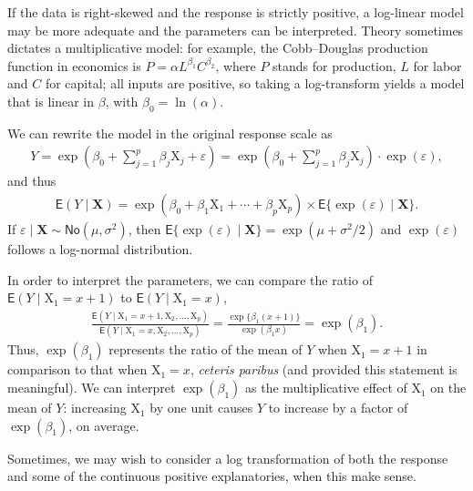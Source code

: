 \documentclass[
  11pt,
  letterpaper,
]{book}
\theoremstyle{definition}
\theoremstyle{definition}
\theoremstyle{definition}
\theoremstyle{definition}
\theoremstyle{remark}
\begin{document}
If the data is right-skewed and the response is strictly positive, a log-linear model may be more adequate and the parameters can be interpreted.
Theory sometimes dictates a multiplicative model: for example, the Cobb--Douglas production function in economics is
\(P=\alpha L^{\beta_1}C^{\beta_2}\), where \(P\) stands for production, \(L\) for labor and \(C\) for capital; all inputs are positive, so taking a log-transform yields a model that is linear in \(\beta\), with \(\beta_0=\ln(\alpha)\).

We can rewrite the model in the original response scale as
\begin{align*}
Y = \exp\left(\beta_0+\sum_{j=1}^p\beta_j\mathrm{X}_j +  \varepsilon \right) = \exp\left(\beta_0+ \sum_{j=1}^p\beta_j\mathrm{X}_j\right)\cdot \exp(\varepsilon),
\end{align*}
and thus
\begin{align*}
\mathsf{E}(Y \mid \mathbf{X}) = \exp(\beta_0 +\beta_1 \mathrm{X}_1 +\cdots + \beta_p\mathrm{X}_p ) \times \mathsf{E}\{\exp(\varepsilon) \mid \mathbf{X}\}.
\end{align*}
If \(\varepsilon \mid \mathbf{X} \sim \mathsf{No}(\mu,\sigma^2)\), then \(\mathsf{E}\{\exp(\varepsilon) \mid \mathbf{X}\}= \exp(\mu+\sigma^2/2)\) and \(\exp(\varepsilon)\) follows a log-normal distribution.

In order to interpret the parameters, we can compare the ratio of \(\mathsf{E}(Y \mid \mathrm{X}_1=x+1)\) to \(\mathsf{E}(Y \mid \mathrm{X}_1=x)\),
\begin{align*}
\frac{\mathsf{E}(Y \mid \mathrm{X}_1=x+1, \mathrm{X}_2, \ldots, \mathrm{X}_p)}{\mathsf{E}(Y \mid \mathrm{X}_1=x,  \mathrm{X}_2, \ldots, \mathrm{X}_p)} = \frac{\exp\{\beta_1(x+1)\}}{\exp(\beta_1 x)} = \exp(\beta_1).
\end{align*}
Thus, \(\exp(\beta_1)\) represents the ratio of the mean of \(Y\) when \(\mathrm{X}_1=x+1\) in comparison to that when \(\mathrm{X}_1=x\), \emph{ceteris paribus} (and provided this statement is meaningful). We can interpret \(\exp(\beta_1)\) as the multiplicative effect of \(\mathrm{X}_1\) on the mean of \(Y\): increasing \(\mathrm{X}_1\) by one unit causes \(Y\) to increase by a factor of \(\exp(\beta_1)\), on average.

Sometimes, we may wish to consider a log transformation of both the response and some of the continuous positive explanatories, when this make sense.
\end{document}
